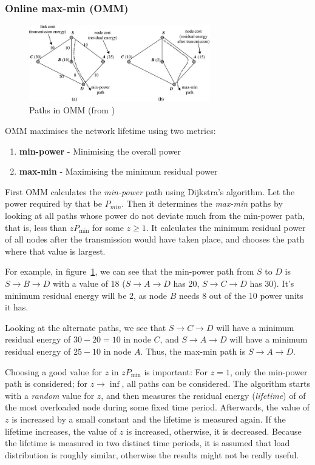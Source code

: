 \documentclass[conference]{IEEEtran}
\begin{document}
\subsubsection{Online max-min (OMM)}
\begin{figure}
\centering
\includegraphics[width=0.7\textwidth]{images/omm}
\caption{Paths in OMM (from \cite{alotaibi2012survey})}
\label{ommex}
\end{figure}

OMM \cite{li2001online} maximises the network lifetime using two metrics:
\begin{enumerate}
  \item \textbf{min-power} - Minimising the overall power
  \item \textbf{max-min} - Maximising the minimum residual power
\end{enumerate}

First OMM calculates the \textit{min-power} path using Dijkstra’s algorithm. Let
the power required by that be $P_{min}$.
Then it determines the \textit{max-min} paths by looking at all paths whose
power do not deviate much from the min-power path, that is, less than $zP_{\min}$
for some $z \ge 1$. It calculates the minimum residual power of all nodes
after the transmission would have taken place, and chooses the path where
that value is largest.

For example, in figure~\ref{ommex}, we can see that the min-power path from
$S$ to $D$ is $S \to B \to D$ with a value of 18 ($S \to A \to D$ has 20,
$S \to C \to D$ has 30).
It's minimum residual energy will be $2$, as node $B$ needs
$8$ out of the $10$ power units it has.

Looking at the alternate paths, we see that $S \to C \to D$ will have a
minimum residual energy of $30-20=10$ in node $C$, and $S \to A \to D$ will
have a minimum residual energy of $25-10$ in node $A$.
Thus, the max-min path is $S \to A \to D$.

Choosing a good value for $z$ in $zP_{\min}$ is important: For $z=1$, only
the min-power path is considered; for $z \to \inf$, all paths can be
considered. The algorithm starts with a \textit{random} value for $z$, and
then measures the residual energy (\textit{lifetime}) of of the most overloaded node during some
fixed time period. Afterwards, the value of $z$ is increased by a small constant
and the lifetime is measured again. If the lifetime increases, the value of $z$
is increased, otherwise, it is decreased. Because the lifetime is measured
in two distinct time periods, it is assumed that load distribution is roughly
similar, otherwise the results might not be really useful.
\end{document}
